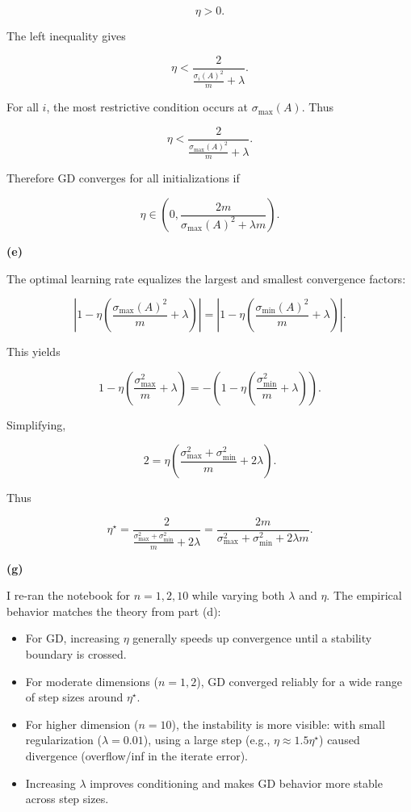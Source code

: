 \documentclass[
  12pt,
]{fphw}
\begin{document}
\[
\eta>0.
\]

The left inequality gives

\[
\eta
<
\frac{2}{\frac{\sigma_i(A)^2}{m}+\lambda}.
\]

For all \(i\), the most restrictive condition occurs at
\(\sigma_{\max}(A)\). Thus

\[
\eta
<
\frac{2}{\frac{\sigma_{\max}(A)^2}{m}+\lambda}.
\]

Therefore GD converges for all initializations if

\[
\eta\in
\left(
0,
\frac{2m}{\sigma_{\max}(A)^2+\lambda m}
\right).
\]


\textbf{(e)}

The optimal learning rate equalizes the largest and smallest convergence factors:

\[
\left|
1-\eta\left(\frac{\sigma_{\max}(A)^2}{m}+\lambda\right)
\right|
=
\left|
1-\eta\left(\frac{\sigma_{\min}(A)^2}{m}+\lambda\right)
\right|.
\]

This yields

\[
1-\eta\left(\frac{\sigma_{\max}^2}{m}+\lambda\right)
=
-
\left(
1-\eta\left(\frac{\sigma_{\min}^2}{m}+\lambda\right)
\right).
\]

Simplifying,

\[
2
=
\eta
\left(
\frac{\sigma_{\max}^2+\sigma_{\min}^2}{m}+2\lambda
\right).
\]

Thus

\[
\eta^\star
=
\frac{2}
{\frac{\sigma_{\max}^2+\sigma_{\min}^2}{m}+2\lambda}
=
\frac{2m}{\sigma_{\max}^2+\sigma_{\min}^2+2\lambda m}.
\]

\textbf{(g)}

I re-ran the notebook for $n=1,2,10$ while varying both $\lambda$ and $\eta$.
The empirical behavior matches the theory from part (d):

\begin{itemize}
  \item For GD, increasing $\eta$ generally speeds up convergence until a stability boundary is crossed.
  \item For moderate dimensions ($n=1,2$), GD converged reliably for a wide range of step sizes around $\eta^\star$.
  \item For higher dimension ($n=10$), the instability is more visible: with small regularization ($\lambda=0.01$), using a large step (e.g., $\eta\approx 1.5\eta^\star$) caused divergence (overflow/inf in the iterate error).
  \item Increasing $\lambda$ improves conditioning and makes GD behavior more stable across step sizes.
\end{itemize}
\end{document}
